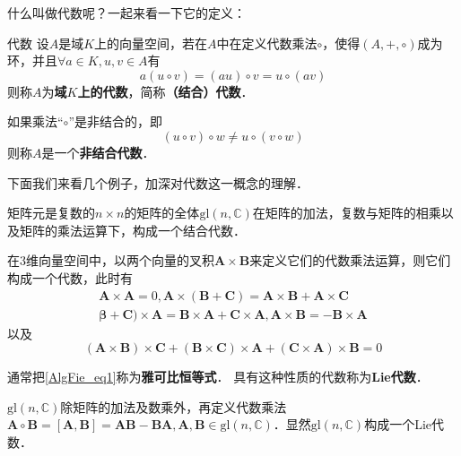 

什么叫做代数呢？一起来看一下它的定义：
\begin{definition}{代数}
设$A$是域$K$上的向量空间，若在$A$中在定义代数乘法$\circ$，使得$(A,+,\circ)$成为环，并且$\forall a\in K, u, v\in A$有
\begin{equation}
a(u \circ v)=(a u) \circ v=u{\circ}(a v)
\end{equation}
则称$A$为\textbf{域$K$上的代数}，简称\textbf{（结合）代数}．

如果乘法“$\circ$”是非结合的，即
\begin{equation}
\left(u {\circ} v\right) \circ w \neq u{\circ}\left(v{\circ} w\right)
\end{equation}
则称$A$是一个\textbf{非结合代数}．
\end{definition}

下面我们来看几个例子，加深对代数这一概念的理解．

\begin{example}{}
矩阵元是复数的$n\times n$的矩阵的全体$\mathrm{gl}(n, \mathbb C)$在矩阵的加法，复数与矩阵的相乘以及矩阵的乘法运算下，构成一个结合代数．
\end{example}

\begin{example}{}
在$3$维向量空间中，以两个向量的叉积$\mathbf A\times \mathbf B$来定义它们的代数乘法运算，则它们构成一个代数，此时有
\begin{equation}
\begin{array}{l}\mathbf{A} \times \mathbf{A}=0, \mathbf{A} \times(\mathbf{B}+\mathbf{C})=\mathbf{A} \times \mathbf{B}+\mathbf{A} \times \mathbf{C} \\ \mathbf{\beta}+\mathbf{C}) \times \mathbf{A}=\mathbf{B} \times \mathbf{A}+\mathbf{C} \times \mathbf{A}, \mathbf{A} \times \mathbf{B}=-\mathbf{B} \times \mathbf{A}\end{array}
\end{equation}
以及
\begin{equation} \label{AlgFie_eq1}
(\mathbf{A} \times \mathbf{B}) \times \mathbf{C}+(\mathbf{B} \times \mathbf{C}) \times \mathbf{A}+(\mathbf{C} \times \mathbf{A}) \times \mathbf{B}=0
\end{equation}
\end{example}

通常把\autoref{AlgFie_eq1}称为\textbf{雅可比恒等式}． 具有这种性质的代数称为\textbf{Lie代数}．

\begin{example}{}
$\mathrm{gl}(n, \mathbb C)$除矩阵的加法及数乘外，再定义代数乘法$\mathbf A\circ \mathbf B=[\mathbf A, \mathbf B] = \mathbf A \mathbf B - \mathbf B\mathbf A, \mathbf A, \mathbf B\in \mathrm{gl}(n, \mathbb C)$．显然$\mathrm{gl}(n,\mathbb C)$构成一个Lie代数．
\end{example}


